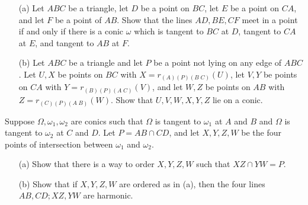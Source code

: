 \begin{exer}\label{cevaconic}\hspace{2em}
\begin{itemize}
\item[(a)] Let $ABC$ be a triangle, let $D$ be a point on $BC$, let $E$ be a point on $CA$, and let $F$ be a point of $AB$. Show that the lines $AD,BE,CF$ meet in a point if and only if there is a conic $\omega$ which is tangent to $BC$ at $D$, tangent to $CA$ at $E$, and tangent to $AB$ at $F$.
\item[(b)] Let $ABC$ be a triangle and let $P$ be a point not lying on any edge of $ABC$. Let $U,X$ be points on $BC$ with $X = r_{(A)(P)(B\;C)}(U)$, let $V,Y$ be points on $CA$ with $Y = r_{(B)(P)(A\;C)}(V)$, and let $W,Z$ be points on $AB$ with $Z = r_{(C)(P)(A\;B)}(W)$. Show that $U,V,W,X,Y,Z$ lie on a conic.
\end{itemize}
\end{exer}

\begin{exer} Suppose $\Omega, \omega_1, \omega_2$ are conics such that $\Omega$ is tangent to $\omega_1$ at $A$ and $B$ and $\Omega$ is tangent to $\omega_2$ at $C$ and $D$. Let $P = AB\cap CD$, and let $X,Y,Z,W$ be the four points of intersection between $\omega_1$ and $\omega_2$.
\begin{itemize}
\item[(a)] Show that there is a way to order $X,Y,Z,W$ such that $XZ \cap YW = P$.

\item[(b)] Show that if $X,Y,Z,W$ are ordered as in (a), then the four lines $AB, CD; XZ, YW$ are harmonic.
\end{itemize}
\end{exer}

